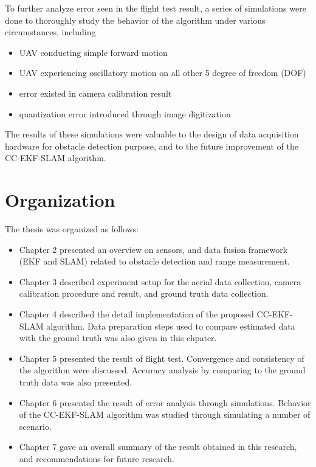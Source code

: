 To further analyze error seen in the flight test result, a series
of simulations were done to thoroughly study the behavior of the
algorithm under various circumstances, including
\begin{itemize}
\item UAV conducting simple forward motion
\item UAV experiencing oscillatory motion on all other 5 degree of
freedom (DOF)
\item error existed in camera calibration result
\item quantization error introduced through image digitization 
\end{itemize}
The results of these simulations were valuable to the design of data
acquisition hardware for obstacle detection purpose, and to the future
improvement of the CC-EKF-SLAM algorithm.

\section{Organization}\label{section:Organization}
The thesis was organized as follows:

\begin{itemize}
  \item Chapter 2 presented an overview on sensors, and data fusion
  framework (EKF and SLAM) related to obstacle detection and range
  measurement.
  \item Chapter 3 described experiment setup for the aerial data
  collection, camera calibration procedure and result, and ground
  truth data collection.
  \item Chapter 4 described the detail implementation of the proposed
  CC-EKF-SLAM algorithm. Data preparation steps used to compare
  estimated data with the ground truth was also given in this chpater.
  \item Chapter 5 presented the result of flight test. Convergence and
  consistency of the algorithm were discussed. Accuracy analysis by
  comparing to the ground truth data was also presented.
  \item Chapter 6 presented the result of error analysis through
  simulations. Behavior of the CC-EKF-SLAM
  algorithm was studied through simulating a number of scenario.
  \item Chapter 7 gave an overall summary of the result obtained in
  this research, and recommendations for future research.
\end{itemize}

